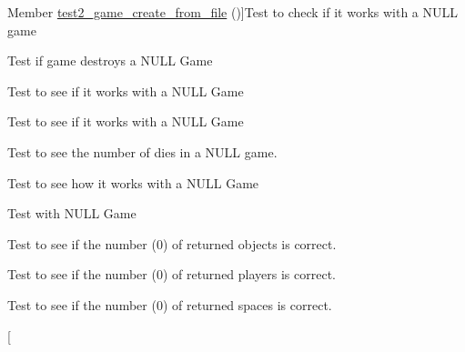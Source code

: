 \begin{DoxyRefList}
Member \hyperlink{game__test_8h_ad6ce67f6184f6ead2aaca860f64e9b76}{test2\+\_\+game\+\_\+create\+\_\+from\+\_\+file} ()]Test to check if it works with a N\+U\+LL game  
\item[\label{test__test000035}%
\hypertarget{test__test000035}{}%
Member \hyperlink{game__test_8h_a91a33a9fce738616f2140d06a6ff079f}{test2\+\_\+game\+\_\+destroy} ()]Test if game destroys a N\+U\+LL Game  
\item[\label{test__test000068}%
\hypertarget{test__test000068}{}%
Member \hyperlink{game__test_8h_a5894e9abe6b633d53b01ad8691655a26}{test2\+\_\+game\+\_\+find} ()]Test to see if it works with a N\+U\+LL Game  
\item[\label{test__test000071}%
\hypertarget{test__test000071}{}%
Member \hyperlink{game__test_8h_a4a26a36f14da83a296ff5057ddfd67a7}{test2\+\_\+game\+\_\+find\+\_\+name} ()]Test to see if it works with a N\+U\+LL Game  
\item[\label{test__test000066}%
\hypertarget{test__test000066}{}%
Member \hyperlink{game__test_8h_a3cf79c20d8101232319754300c699a22}{test2\+\_\+game\+\_\+get\+\_\+dies\+\_\+number} ()]Test to see the number of dies in a N\+U\+LL game.  
\item[\label{test__test000083}%
\hypertarget{test__test000083}{}%
Member \hyperlink{game__test_8h_af601b07387856d9fbf5fb30eaae11191}{test2\+\_\+game\+\_\+get\+\_\+last\+\_\+check} ()]Test to see how it works with a N\+U\+LL Game  
\item[\label{test__test000079}%
\hypertarget{test__test000079}{}%
Member \hyperlink{game__test_8h_ac6463a36d0a06d720225b64f894ec445}{test2\+\_\+game\+\_\+get\+\_\+last\+\_\+command} ()]Test with N\+U\+LL Game  
\item[\label{test__test000062}%
\hypertarget{test__test000062}{}%
Member \hyperlink{game__test_8h_a666e45de68b2bbc214dbd1c7f0cbc1ff}{test2\+\_\+game\+\_\+get\+\_\+objects\+\_\+number} ()]Test to see if the number (0) of returned objects is correct.  
\item[\label{test__test000058}%
\hypertarget{test__test000058}{}%
Member \hyperlink{game__test_8h_a2a530a4de5f42cebd34d3a2b13b571b3}{test2\+\_\+game\+\_\+get\+\_\+players\+\_\+number} ()]Test to see if the number (0) of returned players is correct.  
\item[\label{test__test000054}%
\hypertarget{test__test000054}{}%
Member \hyperlink{game__test_8h_ae8acea54aeabc7ca6bb3f4ccb7019947}{test2\+\_\+game\+\_\+get\+\_\+spaces\+\_\+number} ()]Test to see if the number (0) of returned spaces is correct.  
\item[\label{test__test000081}%

\end{DoxyRefList}
